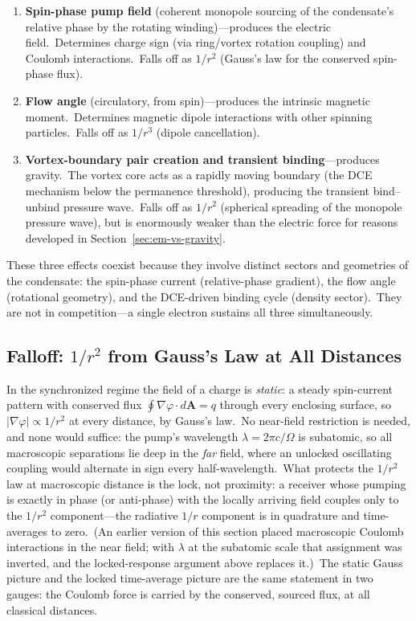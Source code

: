 ﻿\documentclass[12pt,letterpaper]{article}
\begin{document}
\begin{enumerate}[leftmargin=2em]
  \item \textbf{Spin-phase pump field} (coherent monopole sourcing of the
    condensate's relative phase by the rotating winding)---produces the
    electric field.\ Determines charge sign (via ring/vortex rotation
    coupling) and Coulomb interactions.\ Falls off as $1/r^2$ (Gauss's law
    for the conserved spin-phase flux).

  \item \textbf{Flow angle} (circulatory, from spin)---produces the intrinsic magnetic moment.\
    Determines magnetic dipole interactions with other spinning particles.\ Falls off as
    $1/r^3$ (dipole cancellation).

  \item \textbf{Vortex-boundary pair creation and transient binding}---produces gravity.\ The
    vortex core acts as a rapidly moving boundary (the DCE mechanism below the permanence
    threshold), producing the transient bind--unbind pressure wave.\ Falls off as $1/r^2$
    (spherical spreading of the monopole pressure wave), but is enormously weaker than the
    electric force for reasons developed in Section~\ref{sec:em-vs-gravity}.
\end{enumerate}

These three effects coexist because they involve distinct sectors and
geometries of the condensate: the spin-phase current (relative-phase
gradient), the flow angle (rotational geometry), and the DCE-driven binding
cycle (density sector).\ They are not in competition---a single electron
sustains all three simultaneously.


\subsection{Falloff: \texorpdfstring{$1/r^2$}{1/r2} from Gauss's Law at All Distances}
\label{sec:falloff}

In the synchronized regime the field of a charge is \emph{static}: a steady
spin-current pattern with conserved flux
$\oint \nabla\varphi \cdot d\mathbf{A} = q$ through every enclosing
surface, so $|\nabla\varphi| \propto 1/r^2$ at every distance, by Gauss's
law.\ No near-field restriction is needed, and none would suffice: the
pump's wavelength $\lambda = 2\pi c/\Omega$ is subatomic, so all macroscopic
separations lie deep in the \emph{far} field, where an unlocked oscillating
coupling would alternate in sign every half-wavelength.\ What protects the
$1/r^2$ law at macroscopic distance is the lock, not proximity: a receiver
whose pumping is exactly in phase (or anti-phase) with the locally arriving
field couples only to the $1/r^2$ component---the radiative $1/r$ component
is in quadrature and time-averages to zero.\ (An earlier version of this
section placed macroscopic Coulomb interactions in the near field; with
$\lambda$ at the subatomic scale that assignment was inverted, and the
locked-response argument above replaces it.)\ The static Gauss picture and
the locked time-average picture are the same statement in two gauges: the
Coulomb force is carried by the conserved, sourced flux, at all classical
distances.
\end{document}
